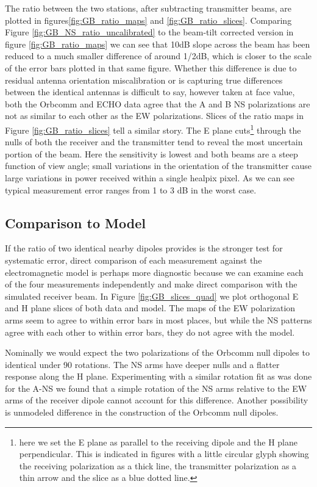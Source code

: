 \documentclass[preprint2,numberedappendix,tighten,twocolappendix]{aastex6}
\begin{document}
The ratio between the two stations, after subtracting transmitter beams, are plotted in figures\ref{fig:GB_ratio_maps} and \ref{fig:GB_ratio_slices}. Comparing Figure \ref{fig:GB_NS_ratio_uncalibrated} to the beam-tilt corrected version in figure \ref{fig:GB_ratio_maps} we can see that 10dB slope across the beam has been reduced to a much smaller difference of around 1/2dB, which is closer to the scale of the error bars plotted in that same figure. Whether this difference is due to residual antenna orientation miscalibration or is capturing true differences between the identical antennas is difficult to say, however taken at face value, both the Orbcomm and ECHO data agree that the A and B NS polarizations are not as similar to each other as the EW polarizations. Slices of the ratio maps in Figure \ref{fig:GB_ratio_slices} tell a similar story.  The E plane cuts\footnote{here we set the E plane as parallel to the receiving dipole and the H plane perpendicular.  This is indicated in figures with a little circular glyph showing the receiving polarization as a thick line, the transmitter polarization as a thin arrow and the slice as a blue dotted line.} through the nulls of both the receiver and the transmitter tend to reveal the most uncertain portion of the beam. Here the sensitivity is lowest and both beams are a steep function of view angle;  small variations in the orientation of the transmitter cause large variations in power received within a single healpix pixel.  As we can see typical measurement error ranges from 1 to 3 dB in the worst case.

\subsection{Comparison to Model}

If the ratio of two identical nearby dipoles provides is the stronger test for systematic error, direct comparison of each measurement against the electromagnetic model is perhaps more diagnostic because we can examine each of the four measurements independently and make direct comparison with the simulated receiver beam. In Figure \ref{fig:GB_slices_quad} we plot orthogonal E and H plane slices of both data and model. The maps of the EW polarization arms seem to agree to within error bars in most places, but while the NS patterns agree with each other to within error bars, they do not agree with the model. 

Nominally we would expect the two polarizations of the Orbcomm null dipoles to identical under 90\arcdeg{} rotations.  The NS arms have deeper nulls and a flatter response along the H plane. Experimenting with a similar rotation fit as was done for the A-NS we found that a simple rotation of the NS arms relative to the EW arms of the receiver dipole cannot account for this difference. Another possibility is unmodeled difference in the construction of the Orbcomm null dipoles.
\end{document}
